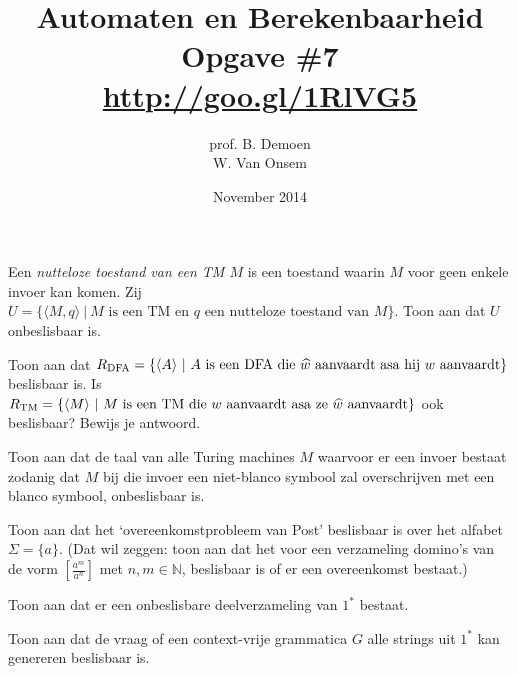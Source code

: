 \documentclass[a4paper]{article}
\title{Automaten en Berekenbaarheid\\Opgave \#7\\\url{http://goo.gl/1RlVG5}}
\author{prof. B. Demoen\\W. Van Onsem}
\date{November 2014}
\begin{document}
\maketitle

\begin{question}
Een \emph{nutteloze toestand van een TM $M$} is een toestand waarin $M$ voor geen enkele invoer kan komen. Zij $U = \{ \langle M, q \rangle \ | \ \text{$M$ is een TM en $q$ een nutteloze toestand van $M$} \}$. Toon aan dat $U$ onbeslisbaar is.
\begin{answer}

\end{answer}
\end{question}

\begin{question}
Toon aan dat $R_{\rm DFA} = \{ \langle A \rangle \ | \ \text{$A$ is een DFA die $\widehat{w}$ aanvaardt asa hij $w$ aanvaardt} \}$ beslisbaar is. Is $R_{\rm TM} = \{ \langle M \rangle \ | \ \text{$M$ is een TM die $w$ aanvaardt asa ze $\widehat{w}$ aanvaardt} \}$ ook beslisbaar? Bewijs je antwoord.
\begin{answer}

\end{answer}
\end{question}

\begin{question}
Toon aan dat de taal van alle Turing machines $M$ waarvoor er een invoer bestaat zodanig dat $M$ bij die invoer een niet-blanco symbool zal overschrijven met een blanco symbool, onbeslisbaar is.
\begin{answer}

\end{answer}
\end{question}

\begin{question}
Toon aan dat het `overeenkomstprobleem van Post' beslisbaar is over het alfabet $\Sigma = \{ a \}$. (Dat wil zeggen: toon aan dat het voor een verzameling domino's van de vorm $\left[ \frac{a^m}{a^n} \right]$ met $n,m \in \mathbb{N}$, beslisbaar is of er een overeenkomst bestaat.) 
\begin{answer}

\end{answer}
\end{question}

\begin{question}
Toon aan dat er een onbeslisbare deelverzameling van $1^*$ bestaat.
\begin{answer}

\end{answer}
\end{question}

\begin{question}
Toon aan dat de vraag of een context-vrije grammatica $G$ alle strings uit $1^*$ kan genereren beslisbaar is.
\begin{answer}

\end{answer}
\end{question}
\end{document}
